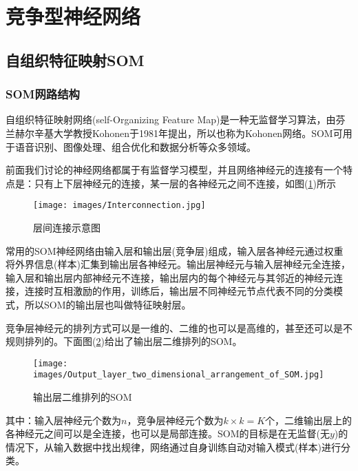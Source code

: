 \section{竞争型神经网络}
    \subsection{自组织特征映射SOM}
        \subsubsection{SOM网路结构}
            \par
            自组织特征映射网络(self-Organizing Feature Map)是一种无监督学习算法，由芬兰赫尔辛基大学教授Kohonen于1981年提出，所以也称为Kohonen网络。SOM可用于语音识别、图像处理、组合优化和数据分析等众多领域。
            \par
            前面我们讨论的神经网络都属于有监督学习模型，并且网络神经元的连接有一个特点是：只有上下层神经元的连接，某一层的各神经元之间不连接，如图(\ref{fig:层间连接示意图})所示
            \begin{figure}[H]
            \centering
            \texttt{[image: images/Interconnection.jpg]}
            \caption{层间连接示意图}
            \label{fig:层间连接示意图}
            \end{figure}
            \par
            常用的SOM神经网络由输入层和输出层(竞争层)组成，输入层各神经元通过权重将外界信息(样本)汇集到输出层各神经元。输出层神经元与输入层神经元全连接，输入层和输出层内部神经元不连接，输出层内的每个神经元与其邻近的神经元连接，连接时互相激励的作用，训练后，输出层不同神经元节点代表不同的分类模式，所以SOM的输出层也叫做特征映射层。
            \par
            竞争层神经元的排列方式可以是一维的、二维的也可以是高维的，甚至还可以是不规则排列的。下面图(\ref{fig:输出层二维排列的SOM})给出了输出层二维排列的SOM。
            \begin{figure}[H]
            \centering
            \texttt{[image: images/Output\_layer\_two\_dimensional\_arrangement\_of\_SOM.jpg]}
            \caption{输出层二维排列的SOM}
            \label{fig:输出层二维排列的SOM}
            \end{figure}
            其中：输入层神经元个数为$n$，竞争层神经元个数为$k\times k = K$个，二维输出层上的各神经元之间可以是全连接，也可以是局部连接。SOM的目标是在无监督(无$y$)的情况下，从输入数据中找出规律，网络通过自身训练自动对输入模式(样本)进行分类。
